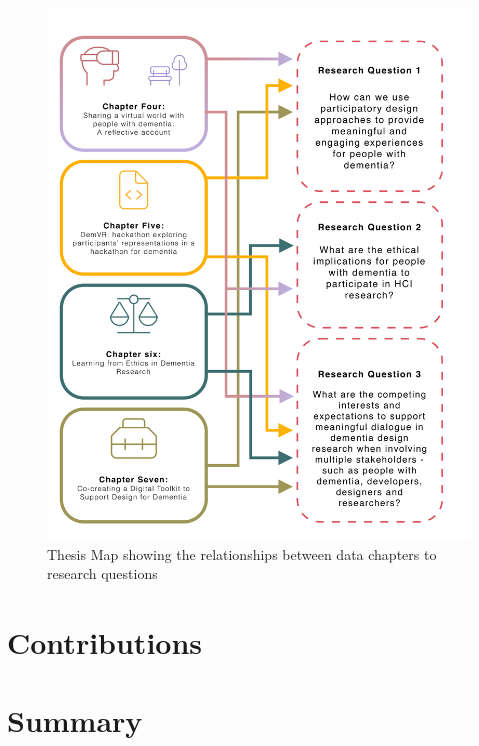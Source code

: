 \label{Intro:Thesis Map}
\begin{figure}[htp]
\centering
\includegraphics[width=.8\linewidth]{Images/Thesis_Narrative/RQ_and_Chapters.png}
\caption{Thesis Map showing the relationships between data chapters to research questions}
\label{fig:RQ_and_Chapters}
\end{figure}


\section{Contributions}
\label{Intro:Contribution}

\section{Summary}
\label{Intro: Summary}